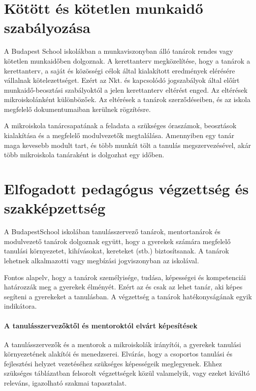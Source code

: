 \section{Kötött és kötetlen munkaidő szabályozása}

A Budapest School iskolákban a munkaviszonyban álló tanárok rendes vagy kötetlen munkaidőben dolgoznak.
A kerettanterv megközelítése, hogy a tanárok a kerettanterv, a saját és közösségi célok által kialakított eredmények elérésére vállalnak kötelezettséget. Ezért az Nkt. és kapcsolódó jogszabályok által előírt munkaidő-beosztási szabályoktól a jelen kerettanterv eltérést enged. Az eltérések mikroiskolánként különbözőek. Az eltérések a tanárok szerződéseiben, és az iskola megfelelő dokumentumaiban kerülnek rögzítésre.

A mikroiskola tanárcsapatának a feladata a szükséges óraszámok, beosztások kialakítása és a megfelelő modulvezetők megtalálása. Amennyiben egy tanár maga kevesebb modult tart, és több munkát tölt a tanulás megszervezésével, akár több mikroiskola tanáraként is dolgozhat egy időben.

\section{Elfogadott pedagógus végzettség és szakképzettség}

A Budapest\break School iskolában tanulásszervező tanárok, mentortanárok és modulvezető tanárok dolgoznak együtt, hogy a gyerekek számára megfelelő tanulási környezetet, kihívásokat, kereteket (stb.) biztosítsanak. A tanárok lehetnek alkalmazotti vagy megbízási jogviszonyban az iskolával.

Fontos alapelv, hogy a tanárok személyisége, tudása, képességei és kompetenciái határozzák meg a gyerekek élményét.  Ezért az és csak az lehet tanár, aki képes segíteni a gyerekeket a tanulásban. A végzettség a tanárok hatékonyságának egyik indikátora.

\paragraph{A tanulásszervezőktől és mentoroktól elvárt képesítések} A
tanulásszervezők és a mentorok a mikroiskolák irányítói, a gyerekek tanulási környezetének alakítói és menedzserei. Elvárás, hogy a csoportos tanulási és fejlesztési helyzet vezetéséhez szükséges képességeik meglegyenek. Ehhez szükséges  táblázatban felsorolt végzettségek közül valamelyik, vagy ezeket kiváltó releváns, igazolható szakmai tapasztalat.

